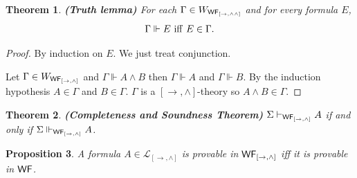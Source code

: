 \documentclass[12pt]{article}
\newtheorem{thm}{Theorem}[section]
\newtheorem{prop}[thm]{Proposition}
\newtheorem{lem}[thm]{Lemma}
\begin{document}


\begin{thm}
\label{uuu}
\em\textbf{(Truth lemma)} For each $ \Gamma \in  W_{{\sf WF_{[\rightarrow, \wedge\wedge]}}}$ and for every formula $  E $, $$ \Gamma\Vdash   E~{\rm iff}~ E \in \Gamma .$$
\end{thm}
\begin{proof} By induction on $E$. We just treat conjunction.

Let $ \Gamma \in  W_{{\sf WF_{  [\rightarrow , \wedge]}}}$ and $  \Gamma\Vdash A\wedge B  $ then $  \Gamma\Vdash A  $ and $  \Gamma\Vdash B  $. By the induction hypothesis $ A \in \Gamma $ and $ B \in \Gamma $. $ \Gamma $ is a $[\rightarrow , \wedge]$-theory so $ A\wedge B \in \Gamma $.




  \end{proof}

\begin{thm}
\em\textbf{(Completeness and Soundness Theorem)} $ \Sigma\vdash_{{\sf WF_{[\rightarrow , \wedge]}} } A $ if and only if $ \Sigma\Vdash_{{\sf WF_{[\rightarrow , \wedge]}} } A $.
\end{thm}

\begin{prop}
A formula $ A \in \mathcal{L}_{[\rightarrow, \wedge]} $ is provable in $ {\sf WF_{[\rightarrow, \wedge]}}$ iff it is provable in ${\sf WF}  $.
 \end{prop}
\end{document}
